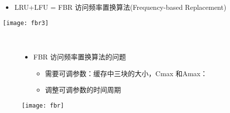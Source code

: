 \begin{frame}[plain]
	\frametitle{ }
	\begin{columns}
		\begin{column}{.0\textwidth}
			\centering
		\end{column}
		
		\begin{column}{1.0\textwidth}
			
			\begin{itemize}
				\item LRU+LFU = FBR 访问频率置换算法(Frequency-based Replacement)
				
			\end{itemize}
			
			\texttt{[image: fbr3]}
		\end{column}
		
		
	\end{columns}
\end{frame}



\begin{frame}[plain]
	\frametitle{ }
	\begin{columns}
		\begin{column}{.0\textwidth}
			\centering
		\end{column}
		
		\begin{column}{1.0\textwidth}
			
			\begin{itemize}
				\item FBR 访问频率置换算法的问题
				
					\begin{itemize}
					\item 需要可调参数：缓存中三块的大小，Cmax 和Amax：
					\item 调整可调参数的时间周期
				\end{itemize}
			\end{itemize}
			\centering
			\texttt{[image: fbr]}
		\end{column}
		
		
	\end{columns}
\end{frame}







